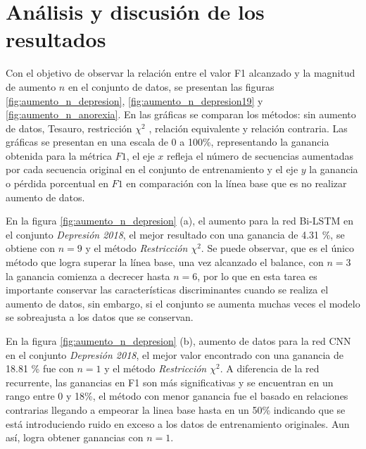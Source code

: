 \section{Análisis y discusión de los resultados}

Con el objetivo de observar la relación entre el valor F1 alcanzado y la magnitud de aumento $n$ en el conjunto de datos, se presentan las figuras \ref{fig:aumento_n_depresion}, \ref{fig:aumento_n_depresion19} y \ref{fig:aumento_n_anorexia}. En las gráficas se comparan los métodos: sin aumento de datos, Tesauro, restricción $\chi^2$ , relación equivalente y relación contraria. Las gráficas se presentan en una escala de 0 a 100\%, representando la ganancia obtenida para la métrica $F1$, el eje $x$ refleja el número de secuencias aumentadas por cada secuencia original en el conjunto de entrenamiento y el eje $y$ la ganancia o pérdida porcentual en $F1$ en comparación con la línea base que es no realizar aumento de datos. 

En la figura \ref{fig:aumento_n_depresion} (a), el aumento para la red Bi-LSTM en el conjunto \textit{Depresión 2018}, el mejor resultado con una ganancia de 4.31 \%, se obtiene con $n=9$ y el método \textit{Restricción $\chi^2$}. Se puede observar, que es el único método que logra superar la línea base, una vez alcanzado el balance, con $n=3$ la ganancia comienza a decrecer hasta $n=6$, por lo que en esta tarea es importante conservar las características discriminantes cuando se realiza el aumento de datos, sin embargo, si el conjunto se aumenta muchas veces el modelo se sobreajusta a los datos que se conservan.

En la figura \ref{fig:aumento_n_depresion} (b), aumento de datos para la red CNN en el conjunto \textit{Depresión 2018}, el mejor valor encontrado con una ganancia de 18.81 \% fue con $n=1$ y el método \textit{Restricción $\chi^2$}. A diferencia de la red recurrente, las ganancias en F1 son más significativas y se encuentran en un rango entre 0 y 18\%, el método con menor ganancia fue el basado en relaciones contrarias llegando a empeorar la linea base hasta en un 50\% indicando que se está introduciendo ruido en exceso a los datos de entrenamiento originales. Aun así, logra obtener ganancias con $n=1$. 


